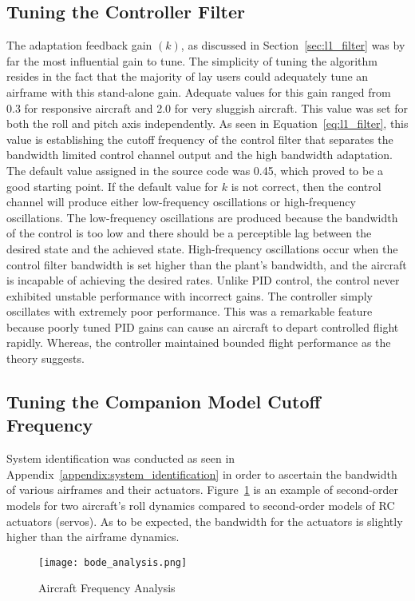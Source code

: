 \subsection{Tuning the Controller Filter}
The adaptation feedback gain $(k)$, as discussed in Section~\ref{sec:l1_filter} was by far the most influential gain to tune.  The simplicity of tuning the \Lone algorithm resides in the fact that the majority of lay users could adequately tune an airframe with this stand-alone gain.  Adequate values for this gain ranged from 0.3 for responsive aircraft and 2.0 for very sluggish aircraft.  This value was set for both the roll and pitch axis independently.  As seen in Equation~\ref{eq:l1_filter}, this value is establishing the cutoff frequency of the control filter that separates the bandwidth limited control channel output and the high bandwidth adaptation.  The default value assigned in the source code was 0.45, which proved to be a good starting point.  If the default value for $k$ is not correct, then the control channel will produce either low-frequency oscillations or high-frequency oscillations.  The low-frequency oscillations are produced because the bandwidth of the control is too low and there should be a perceptible lag between the desired state and the achieved state.  High-frequency oscillations occur when the control filter bandwidth is set higher than the plant's bandwidth, and the aircraft is incapable of achieving the desired rates.  Unlike \ac{PID} control, the \Lone control never exhibited unstable performance with incorrect gains.  The controller simply oscillates with extremely poor performance.  This was a remarkable feature because poorly tuned \ac{PID} gains can cause an aircraft to depart controlled flight rapidly. Whereas, the \Lone controller maintained bounded flight performance as the theory suggests.  

\subsection{Tuning the Companion Model Cutoff Frequency}
System identification was conducted as seen in Appendix~\ref{appendix:system_identification} in order to ascertain the bandwidth of various airframes and their actuators.  Figure~\ref{fig:bode_analysis} is an example of second-order models for two aircraft's roll dynamics compared to second-order models of \ac{RC} actuators (servos).  As to be expected, the bandwidth for the actuators is slightly higher than the airframe dynamics.  
\begin{figure}[h!]
 \centering
  \texttt{[image: bode\_analysis.png]}
  \caption{Aircraft Frequency Analysis }
  \label{fig:bode_analysis}
\end{figure}

